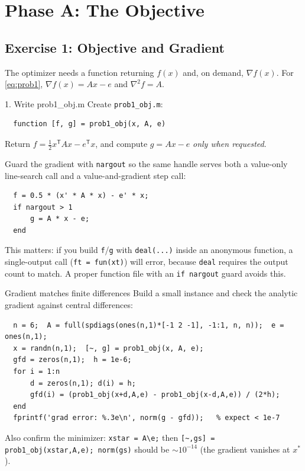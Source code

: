 \documentclass[11pt,letterpaper]{article}
\newcommand{\grad}{\nabla}
\newcommand{\T}{^{\mathsf{T}}}
\newcommand{\half}{\tfrac12}
\begin{document}
\section{Phase A: The Objective}

\subsection{Exercise 1: Objective and Gradient}

The optimizer needs a function returning $f(x)$ and, on demand, $\grad f(x)$. For
\eqref{eq:prob1}, $\grad f(x)=Ax-e$ and $\grad^2 f=A$.

\begin{exercise}{1. Write prob1\_obj.m}
Create \texttt{prob1\_obj.m}:
\begin{verbatim}
  function [f, g] = prob1_obj(x, A, e)
\end{verbatim}
Return $f=\half x\T A x - e\T x$, and compute $g=Ax-e$ \emph{only when requested}.
\end{exercise}

\begin{hint}
Guard the gradient with \texttt{nargout} so the same handle serves both a
value-only line-search call and a value-and-gradient step call:
\begin{verbatim}
  f = 0.5 * (x' * A * x) - e' * x;
  if nargout > 1
      g = A * x - e;
  end
\end{verbatim}
This matters: if you build \texttt{f}/\texttt{g} with \texttt{deal(...)} inside an
anonymous function, a single-output call (\texttt{ft = fun(xt)}) will error, because
\texttt{deal} requires the output count to match. A proper function file with an
\texttt{if nargout} guard avoids this.
\end{hint}

\begin{checkpoint}{Gradient matches finite differences}
Build a small instance and check the analytic gradient against central differences:
\begin{verbatim}
  n = 6;  A = full(spdiags(ones(n,1)*[-1 2 -1], -1:1, n, n));  e = ones(n,1);
  x = randn(n,1);  [~, g] = prob1_obj(x, A, e);
  gfd = zeros(n,1);  h = 1e-6;
  for i = 1:n
      d = zeros(n,1); d(i) = h;
      gfd(i) = (prob1_obj(x+d,A,e) - prob1_obj(x-d,A,e)) / (2*h);
  end
  fprintf('grad error: %.3e\n', norm(g - gfd));   % expect < 1e-7
\end{verbatim}
Also confirm the minimizer: \texttt{xstar = A\textbackslash e;} then
\texttt{[\~{},gs] = prob1\_obj(xstar,A,e); norm(gs)} should be $\sim 10^{-14}$
(the gradient vanishes at $x^\ast$).
\end{checkpoint}
\end{document}
